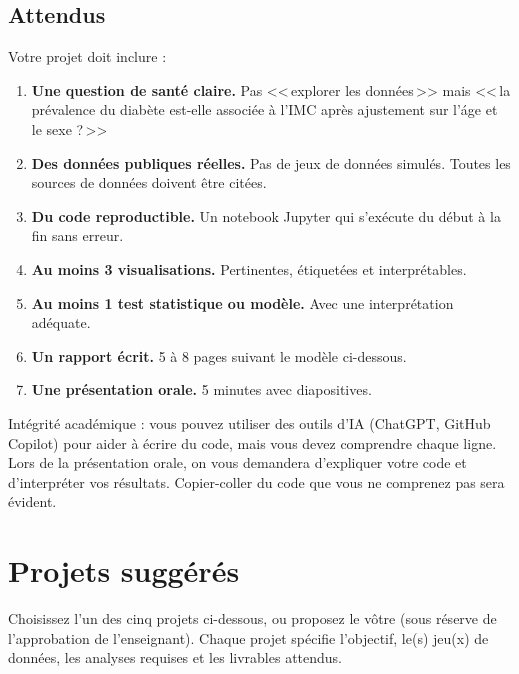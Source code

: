 \subsection{Attendus}

Votre projet doit inclure :
\begin{enumerate}
  \item \textbf{Une question de sant\'e claire.} Pas <<\,explorer les donn\'ees\,>> mais <<\,la pr\'evalence du diab\`ete est-elle associ\'ee \`a l'IMC apr\`es ajustement sur l'\'age et le sexe ?\,>>
  \item \textbf{Des donn\'ees publiques r\'eelles.} Pas de jeux de donn\'ees simul\'es. Toutes les sources de donn\'ees doivent \^etre cit\'ees.
  \item \textbf{Du code reproductible.} Un notebook Jupyter qui s'ex\'ecute du d\'ebut \`a la fin sans erreur.
  \item \textbf{Au moins 3 visualisations.} Pertinentes, \'etiquet\'ees et interpr\'etables.
  \item \textbf{Au moins 1 test statistique ou mod\`ele.} Avec une interpr\'etation ad\'equate.
  \item \textbf{Un rapport \'ecrit.} 5 \`a 8 pages suivant le mod\`ele ci-dessous.
  \item \textbf{Une pr\'esentation orale.} 5 minutes avec diapositives.
\end{enumerate}

\begin{warningbox}
Int\'egrit\'e acad\'emique : vous pouvez utiliser des outils d'IA (ChatGPT, GitHub Copilot) pour aider \`a \'ecrire du code, mais vous devez comprendre chaque ligne. Lors de la pr\'esentation orale, on vous demandera d'expliquer votre code et d'interpr\'eter vos r\'esultats. Copier-coller du code que vous ne comprenez pas sera \'evident.
\end{warningbox}

\section{Projets sugg\'er\'es}

Choisissez l'un des cinq projets ci-dessous, ou proposez le v\^otre (sous r\'eserve de l'approbation de l'enseignant). Chaque projet sp\'ecifie l'objectif, le(s) jeu(x) de donn\'ees, les analyses requises et les livrables attendus.

